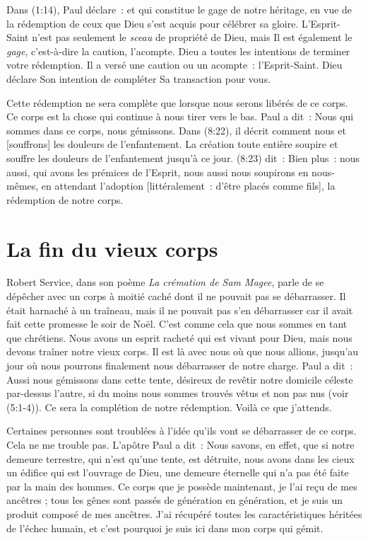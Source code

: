 Dans (1:14), Paul déclare~:
 \og [\dots{}] et qui constitue le gage de notre héritage,
 en vue de la rédemption de ceux que Dieu s'est acquis
 pour célébrer sa gloire. \fg{}
 L'Esprit-Saint n'est pas seulement le \emph{sceau} de propriété de Dieu,
 mais Il est également le \emph{gage}, c'est-à-dire la caution, l'acompte.
 Dieu a toutes les intentions de terminer votre rédemption.
 Il a versé une caution ou un acompte~: l'Esprit-Saint.
 Dieu déclare Son intention de compléter Sa transaction pour vous.

Cette rédemption ne sera complète que lorsque nous serons libérés
 de ce corps.
 Ce corps est la chose qui continue à nous tirer vers le bas.
 Paul a dit~:
 \og Nous qui sommes dans ce corps, nous gémissons. \fg{}
 Dans (8:22), il décrit comment nous
 \og [soupirons] et [souffrons] les douleurs de l'enfantement. \fg{}
 La création toute entière soupire et souffre
 les douleurs de l'enfantement jusqu'à ce jour.
 (8:23) dit~:
 \og Bien plus~: nous aussi, qui avons les prémices de l'Esprit,
 nous aussi nous soupirons en nous-mêmes, en attendant l'adoption
 [littéralement~: d'être placés comme fils],
 la rédemption de notre corps. \fg{}


\section*{La fin du vieux corps}

Robert Service, dans son poème \emph{La crémation de Sam Magee},
 parle de se dépêcher \og avec un corps à moitié caché
 dont il ne pouvait pas se débarrasser. \fg{}
 Il était harnaché à un traîneau, mais il ne pouvait pas s'en débarrasser
 car il avait fait cette promesse le soir de Noël.
 C'est comme cela que nous sommes en tant que chrétiens.
 Nous avons un esprit racheté qui est vivant pour Dieu,
 mais nous devons traîner notre vieux corps.
 Il est là avec nous où que nous allions, jusqu'au jour où nous pourrons
 finalement nous débarrasser de notre charge. Paul a dit~:
 \og Aussi nous gémissons dans cette tente, désireux de revêtir
 notre domicile céleste par-dessus l'autre, si du moins nous sommes
 trouvés vêtus et non pas nus \fg{} (voir (5:1-4)).
 Ce sera la complétion de notre rédemption. Voilà ce que j'attends.

Certaines personnes sont troublées
 à l'idée qu'ils vont se débarrasser de ce corps. Cela ne me trouble pas.
 L'apôtre Paul a dit~:
 \og  Nous savons, en effet, que si notre demeure terrestre,
 qui n'est qu'une tente, est détruite, nous avons dans les cieux
 un édifice qui est l'ouvrage de Dieu, une demeure éternelle
 qui n'a pas été faite par la main des hommes. \fg{}
 Ce corps que je possède maintenant, je l'ai reçu de mes ancêtres ;
 tous les gênes sont passés de génération en génération,
 et je suis un produit composé de mes ancêtres.
 J'ai récupéré toutes les caractéristiques héritées de l'échec humain,
 et c'est pourquoi je suis ici dans mon corps qui gémit.


